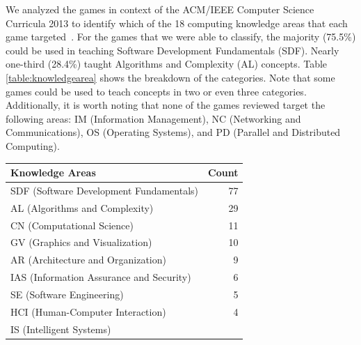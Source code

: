 \documentclass{sig-alternate-05-2015}
\begin{document}
We analyzed the games in context of the ACM/IEEE Computer Science Curricula 2013 to identify which of the 18 computing knowledge areas that each game targeted~\cite{acm13computing}. For the games that we were able to classify, the majority (75.5\%) could be used in teaching Software Development Fundamentals (SDF). Nearly one-third (28.4\%) taught Algorithms and Complexity (AL) concepts. Table \ref{table:knowledgearea} shows the breakdown of the categories. Note that some games could be used to teach concepts in two or even three categories. Additionally, it is worth noting that none of the games reviewed target the following areas: IM (Information Management), NC (Networking and Communications), OS (Operating Systems), and PD (Parallel and Distributed Computing). 



\begin{table}[tb]
\begin{tabularx}{\linewidth}{|X|r|} \hline


Knowledge Areas&


Count\\ \hline


SDF (Software Development Fundamentals)&


77\\ \hline


AL (Algorithms and Complexity)&


29\\ \hline


CN (Computational Science)&


11\\ \hline


GV (Graphics and Visualization)&


10\\ \hline


AR (Architecture and Organization)&


9\\ \hline


IAS (Information Assurance and Security)&


6\\ \hline


SE (Software Engineering)&


5\\ \hline


HCI (Human-Computer Interaction)&


4\\ \hline


IS (Intelligent Systems)&



\end{tabularx}
\end{table}
\end{document}

